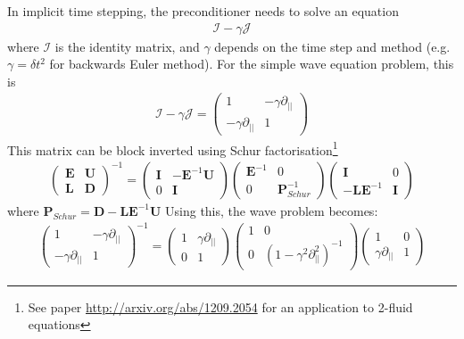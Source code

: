 \documentclass[12pt]{article}
\newcommand{\bb}[1]{\mathbf{#1}}
\begin{document}
In implicit time stepping, the preconditioner needs to solve an equation
%
\begin{align}
\mathcal{I} - \gamma \mathcal{J}
\end{align}
%
where $\mathcal{I}$ is the identity matrix, and $\gamma$ depends on the time
step and method (e.g. $\gamma = \delta t^2$ for backwards Euler method). For
the simple wave equation problem, this is
%
\begin{align}
\mathcal{I} - \gamma \mathcal{J} = \left(%
\begin{array}{cc}
1 & -\gamma\partial_{||} \\
-\gamma\partial_{||} & 1
\end{array}
%
\right)
\end{align}
%
This matrix can be block inverted using Schur factorisation\footnote{See paper
\url{http://arxiv.org/abs/1209.2054} for an application to 2-fluid equations}
%
\begin{align}
\left(%
\begin{array}{cc}
  \bb{E} & \bb{U} \\
  \bb{L} & \bb{D}
\end{array}\right)^{-1}
%
 = \left(%
\begin{array}{cc}
  \bb{I} & -\bb{E}^{-1}\bb{U} \\
  0 & \bb{I}
\end{array}
%
\right)\left(%
\begin{array}{cc}
  \bb{E}^{-1} & 0 \\
  0 & \bb{P}_{Schur}^{-1}
\end{array}
%
\right)\left(%
\begin{array}{cc}
  \bb{I} & 0 \\
  -\bb{L}\bb{E}^{-1} & \bb{I}
\end{array}
%
\right)
\end{align}
%
where $\bb{P}_{Schur} = \bb{D} - \bb{L}\bb{E}^{-1}\bb{U}$ Using this, the wave
problem becomes:
%
\begin{align}
\left(%
\begin{array}{cc}
1 & -\gamma\partial_{||} \\
-\gamma\partial_{||} & 1
\end{array}\right)^{-1}
%
 = \left(%
\begin{array}{cc}
1 & \gamma\partial_{||} \\
0 & 1
\end{array}
%
\right)\left(%
\begin{array}{cc}
1 & 0 \\
0 & \left(1 - \gamma^2\partial^2_{||}\right)^{-1}
\end{array}
%
\right)\left(%
\begin{array}{cc}
1 & 0 \\
\gamma\partial_{||} & 1
\end{array}
%
\right)
%
\label{eq:precon}
%
\end{align}
\end{document}
